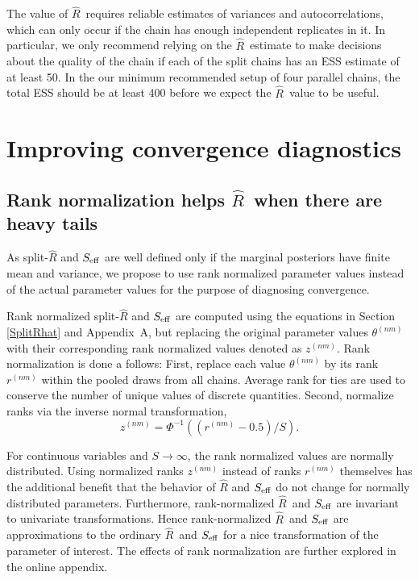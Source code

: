 \documentclass[american,]{article}
\newcommand{\Rhat}{$\widehat{R}$}
\theoremstyle{definition}
\begin{document}
The value of \Rhat\ requires reliable estimates of variances and autocorrelations, which can
only occur if the chain has enough independent replicates in it. In particular, we only recommend 
relying on the \Rhat\ estimate to make decisions about the quality of the chain if each of the 
split chains has an ESS estimate of at least 50. In the our minimum recommended setup of four
parallel chains, the total ESS should be at least 400 before we expect the \Rhat\ value to be useful.


\hypertarget{improving-convergence-diagnostics}{%
\section{Improving convergence
diagnostics}\label{improving-convergence-diagnostics}}

\hypertarget{rank-normalization}{%
\subsection{Rank normalization helps  \Rhat\ when there are heavy tails}\label{rank-normalization}}

As split-\(\widehat{R}\) and \(S_{\rm eff}\) are well defined
only if the marginal posteriors have finite mean and variance, we
propose to use rank normalized parameter values instead of the actual
parameter values for the purpose of diagnosing convergence.

Rank normalized split-\(\widehat{R}\) and \(S_{\rm eff}\) are
computed using the equations in Section \ref{SplitRhat} and Appendix~A, but
replacing the original parameter values \(\theta^{(nm)}\) with their
corresponding rank normalized values denoted as \(z^{(nm)}\). Rank
normalization is done a follows: First, replace each value
\(\theta^{(nm)}\) by its rank \(r^{(nm)}\) within the pooled draws from all chains.
 Average rank for ties are
used to conserve the number of unique values of discrete quantities.
 Second, normalize ranks via the inverse normal transformation,
\begin{equation}
z^{(nm)} = \Phi^{-1}((r^{(nm)}-0.5)/S).
\end{equation}

For continuous variables and \(S \rightarrow \infty\), the rank
normalized values are normally distributed. Using normalized ranks
\(z^{(nm)}\) instead of ranks \(r^{(nm)}\) themselves has the additional
benefit that the behavior of \(\widehat{R}\) and \(S_{\rm eff}\) do
not change for normally distributed parameters.  Furthermore, rank-normalized \Rhat\ and \(S_{\rm eff}\) are invariant to univariate transformations. Hence    
rank-normalized \Rhat\ and \(S_{\rm eff}\) are approximations to the ordinary \Rhat\ and \(S_{\rm eff}\) for a nice transformation of the parameter of interest.
The effects of rank normalization are further explored in the online appendix.
\end{document}

